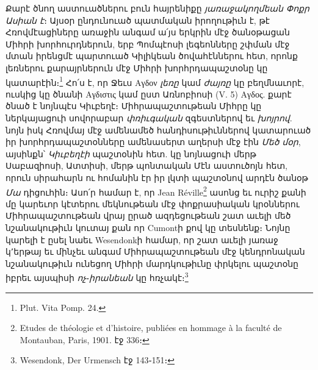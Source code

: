\documentclass{article}
\begin{document}
{Քարէ ծնող աստուածներու բուն հայրենիքը \emph{յառաջակողմեան Փոքր Ասիան է}։ Այսօր ընդունուած պատմական իրողութիւն է, թէ Հռովմէացիները առաջին անգամ ա՛յս երկրին մէջ ծանօթացան Միհրի խորհուրդներուն, երբ Պոմպէոսի լեգեոնները շփման մէջ մտան իրենցմէ պարտուած Կիլիկեան ծովահէններու հետ, որոնք լեռներու քարայրներուն մէջ Միհրի խորհրդապաշտօնը կը կատարէին։\footnote{Plut. Vita Pomp. 24.} Հո՛ս է, որ Ջեւս Αγδον \emph{լեռը} կամ \emph{ժայռը} կը բեղմնաւորէ, ուսկից կը ծնանի Αγδιστις կամ ըստ Առնոբիոսի (V. 5) Αγδος. քարէ ծնած է նոյնպէս Կիւբեղէ։ Միհրապաշտութեան Միհրը կը ներկայացուի սովորաբար \emph{փռիւգական} զգեստներով եւ \emph{խոյրով}. նոյն իսկ Հռովմայ մէջ ամենամեծ հանդիսութիւններով կատարուած իր խորհրդապաշտօնները ամենասերտ աղերսի մէջ էին \emph{Մեծ մօր}, այսինքն՝ \emph{Կիւբեղէի} պաշտօնին հետ. կը նոյնացուի մերթ Սաբազիոսի, Ատտիսի, մերթ պոնտական Մէն աստուծոյն հետ, որուն սիրահարն ու հոմանին էր իր լկտի պաշտօնով արդէն ծանօթ \emph{Մա} դիցուհին։ Ասո՛ր համար է, որ Jean Réville\footnote{Etudes de théologie et d'histoire, publiées en hommage à la faculté de Montauban, Paris, 1901. էջ 336։} ասոնց եւ ուրիշ քանի մը կարեւոր կէտերու մեկնութեան մէջ փոքրասիական կրօններու Միհրապաշտութեան վրայ ըրած ազդեցութեան շատ աւելի մեծ նշանակութիւն կուտայ քան որ Cumontի քով կը տեսնենք։ Նոյնը կարելի է ըսել նաեւ Wesendonkի համար, որ շատ աւելի յառաջ կ՚երթայ եւ մինչեւ անգամ Միհրապաշտութեան մէջ կենդրոնական նշանակութիւն ունեցող Միհրի մարդկութիւնը փրկելու պաշտօնը իբրեւ այսպիսի \emph{ոչ}֊\emph{իրանեան} կը հռչակէ։\footnote{Wesendonk, Der Urmensch էջ 143֊151։}

}
\end{document}

